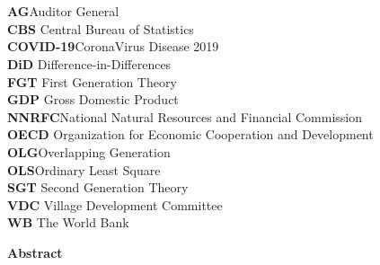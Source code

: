 \section*{}
\textbf{AG}\hspace{32mm}Auditor General\\
\textbf{CBS}\hspace{28mm} Central Bureau of Statistics\\
\textbf{COVID-19}\hspace{17mm}CoronaVirus Disease 2019\\
\textbf{DiD}\hspace{29mm} Difference-in-Differences\\
\textbf{FGT}\hspace{28mm} First Generation Theory\\
\textbf{GDP}\hspace{26mm} Gross Domestic Product\\
\textbf{NNRFC}\hspace{21mm}National Natural Resources and Financial Commission\\
\textbf{OECD}\hspace{23mm} Organization for Economic Cooperation and Development\\
\textbf{OLG}\hspace{28mm}Overlapping Generation\\
\textbf{OLS}\hspace{28mm}Ordinary Least Square\\
\textbf{SGT}\hspace{27mm} Second Generation Theory\\
\textbf{VDC}\hspace{26mm} Village Development Committee\\
\textbf{WB}\hspace{28mm} The World Bank\\






\newpage
\begin{center}
\textbf{\large Abstract}
\end{center}
